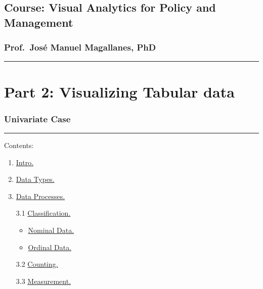 \documentclass[]{article}
\title{}
\author{}
\date{}
\providecommand{\tightlist}{%
  \setlength{\itemsep}{0pt}\setlength{\parskip}{0pt}}
\begin{document}
\subsection{Course: Visual Analytics for Policy and
Management}\label{course-visual-analytics-for-policy-and-management}

\subsubsection{Prof.~José Manuel Magallanes,
PhD}\label{prof.jose-manuel-magallanes-phd}

\begin{center}\rule{0.5\linewidth}{\linethickness}\end{center}

\section{Part 2: Visualizing Tabular
data}\label{part-2-visualizing-tabular-data}

\subsubsection{Univariate Case}\label{univariate-case}

\begin{center}\rule{0.5\linewidth}{\linethickness}\end{center}

Contents:

\begin{enumerate}
\def\labelenumi{\arabic{enumi}.}
\item
  \protect\hyperlink{part1}{Intro.}
\item
  \protect\hyperlink{part2}{Data Types.}
\item
  \protect\hyperlink{part3}{Data Processes.}

  3.1 \protect\hyperlink{part31}{Classification.}

  \begin{itemize}
  \tightlist
  \item
    \protect\hyperlink{part311}{Nominal Data.}
  \item
    \protect\hyperlink{part312}{Ordinal Data.}
  \end{itemize}

  3.2 \protect\hyperlink{part32}{Counting.}

  3.3 \protect\hyperlink{part33}{Measurement.}
\end{enumerate}
\end{document}
